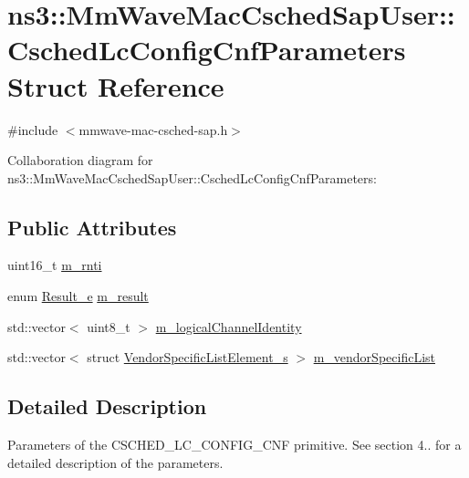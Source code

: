 \hypertarget{structns3_1_1MmWaveMacCschedSapUser_1_1CschedLcConfigCnfParameters}{}\section{ns3\+:\+:Mm\+Wave\+Mac\+Csched\+Sap\+User\+:\+:Csched\+Lc\+Config\+Cnf\+Parameters Struct Reference}
\label{structns3_1_1MmWaveMacCschedSapUser_1_1CschedLcConfigCnfParameters}


{\ttfamily \#include $<$mmwave-\/mac-\/csched-\/sap.\+h$>$}



Collaboration diagram for ns3\+:\+:Mm\+Wave\+Mac\+Csched\+Sap\+User\+:\+:Csched\+Lc\+Config\+Cnf\+Parameters\+:
\subsection*{Public Attributes}
\begin{DoxyCompactItemize}
\item 
uint16\+\_\+t \hyperlink{structns3_1_1MmWaveMacCschedSapUser_1_1CschedLcConfigCnfParameters_a361cbea55573c769795ea10a1e16385c}{m\+\_\+rnti}
\item 
enum \hyperlink{namespacens3_a7acf2b7f9e0781dfe43a6bc54d6ecd07}{Result\+\_\+e} \hyperlink{structns3_1_1MmWaveMacCschedSapUser_1_1CschedLcConfigCnfParameters_ad30f026b4668c3f228ac142366eede0a}{m\+\_\+result}
\item 
std\+::vector$<$ uint8\+\_\+t $>$ \hyperlink{structns3_1_1MmWaveMacCschedSapUser_1_1CschedLcConfigCnfParameters_ae0d38596818f72b04f0f5d15dbb6b4b7}{m\+\_\+logical\+Channel\+Identity}
\item 
std\+::vector$<$ struct \hyperlink{structns3_1_1VendorSpecificListElement__s}{Vendor\+Specific\+List\+Element\+\_\+s} $>$ \hyperlink{structns3_1_1MmWaveMacCschedSapUser_1_1CschedLcConfigCnfParameters_ac4a1305bb35800b860a2658143918d3b}{m\+\_\+vendor\+Specific\+List}
\end{DoxyCompactItemize}


\subsection{Detailed Description}
Parameters of the C\+S\+C\+H\+E\+D\+\_\+\+L\+C\+\_\+\+C\+O\+N\+F\+I\+G\+\_\+\+C\+NF primitive. See section 4.. for a detailed description of the parameters. 

